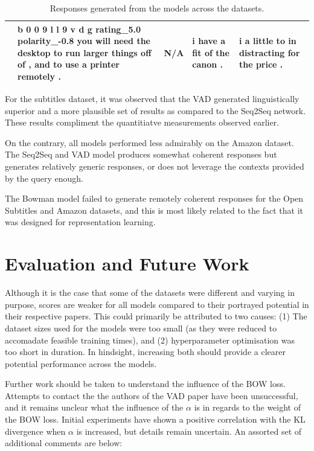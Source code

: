 \documentclass[12pt,twoside]{report}
\begin{document}
\begin{table}[!ht]
\begin{tabular}{|p{1.5cm}|p{2.8cm}|p{2.8cm}|p{2.8cm}|p{2.8cm}|}
													 & b 0 0 9 l l 9 v d g rating\_5.0 polarity\_-0.8 you will need the desktop to run larger things off of , and to use a printer remotely . & N/A                                                       & i have a fit of the canon .                                        & i a little to in distracting for the price .                               \\ \hline
	\end{tabular}
	\caption{Responses generated from the models across the datasets.}
	\label{qualitative_table}
\end{table}

For the subtitles dataset, it was observed that the VAD generated linguistically superior and a more plausible set of results as compared to the Seq2Seq network. These results compliment the quantitiatve measurements observed earlier.

On the contrary, all models performed less admirably on the Amazon dataset. The Seq2Seq and VAD model produces somewhat coherent responses but generates relatively generic responses, or does not leverage the contexts provided by the query enough.

The Bowman model failed to generate remotely coherent responses for the Open Subtitles and Amazon datasets, and this is most likely related to the fact that it was designed for representation learning.

\chapter{Evaluation and Future Work}

Although it is the case that some of the datasets were different and varying in purpose, scores are weaker for all models compared to their portrayed potential in their respective papers. This could primarily be attributed to two causes: (1) The dataset sizes used for the models were too small (as they were reduced to accomadate feasible training times), and (2) hyperparameter optimisation was too short in duration. In hindsight, increasing both should provide a clearer potential performance across the models.

Further work should be taken to understand the influence of the BOW loss. Attempts to contact the the authors of the VAD paper have been unsuccessful, and it remains unclear what the influence of the $\alpha$ is in regards to the weight of the BOW loss. Initial experiments have shown a positive correlation with the KL divergence when $\alpha$ is increased, but details remain uncertain. An assorted set of additional comments are below:
\end{document}
